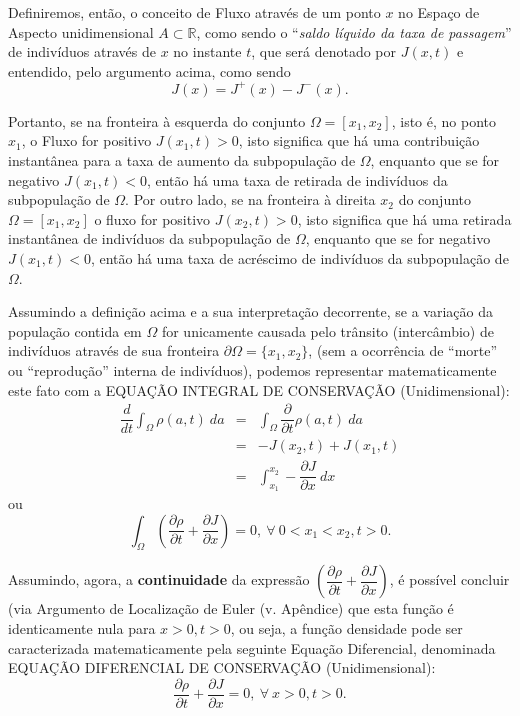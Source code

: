 Definiremos, então, o conceito de Fluxo através de um ponto \(x\) no Espaço de Aspecto unidimensional \(A \subset \mathbb{R}\), como sendo o ``\textit{saldo líquido da taxa de passagem}'' de indivíduos através de \(x\) no instante \(t\), que será denotado por \(J(x,t)\) e entendido, pelo argumento acima, como sendo\[J(x) = J^+(x) - J^-(x).\]

Portanto, se na fronteira à esquerda do conjunto \(\Omega = [x_1, x_2]\), isto é, no ponto \(x_1\), o Fluxo for positivo \(J(x_1, t) > 0\), isto significa que há uma contribuição instantânea para a taxa de aumento da subpopulação de \(\Omega\), enquanto que se for negativo \(J(x_1, t) < 0\), então há uma taxa de retirada de indivíduos da subpopulação de \(\Omega\). Por outro lado, se na fronteira à direita \(x_2\) do conjunto \(\Omega = [x_1, x_2]\) o fluxo for positivo \(J(x_2,t) > 0\), isto significa que há uma retirada instantânea de indivíduos da subpopulação de \(\Omega\), enquanto que se for negativo \(J(x_1,t) < 0\), então há uma taxa de acréscimo de indivíduos da subpopulação de \(\Omega\).

Assumindo a definição acima e a sua interpretação decorrente, se a variação da população contida em \(\Omega\) for unicamente causada pelo trânsito (intercâmbio) de indivíduos através de sua fronteira \(\partial\Omega = \{x_1, x_2\}\), (sem a ocorrência de ``morte'' ou ``reprodução'' interna de indivíduos), podemos representar matematicamente este fato com a EQUAÇÃO INTEGRAL DE CONSERVAÇÃO (Unidimensional):
\[\begin{array}{rcl}
\displaystyle\dfrac{d}{dt}\int_{\Omega} \rho(a,t)\ da
&=& \displaystyle\int_{\Omega} \dfrac{\partial}{\partial t}\rho(a,t)\ da \\[0.5cm]
&=& -J(x_2,t) + J(x_1,t) \\[0.5cm]
&=& \displaystyle\int_{x_1}^{x_2} -\dfrac{\partial J}{\partial x}\ dx
\end{array}\]
ou
\[
\displaystyle\int_{\Omega} \left(\dfrac{\partial \rho}{\partial t} + \dfrac{\partial J}{\partial x}\right) = 0,\ \forall\ 0 < x_1 < x_2, t > 0.
\]

Assumindo, agora, a \textbf{continuidade} da expressão \(\left(\dfrac{\partial \rho}{\partial t} + \dfrac{\partial J}{\partial x}\right)\), é possível concluir (via Argumento de Localização de Euler (v. Apêndice) que esta função é identicamente nula para \(x > 0, t > 0\), ou seja, a função densidade pode ser caracterizada matematicamente pela seguinte Equação Diferencial, denominada EQUAÇÃO DIFERENCIAL DE CONSERVAÇÃO (Unidimensional):
\[\dfrac{\partial \rho}{\partial t} + \dfrac{\partial J}{\partial x} = 0,\ \forall\ x > 0, t > 0.\]

